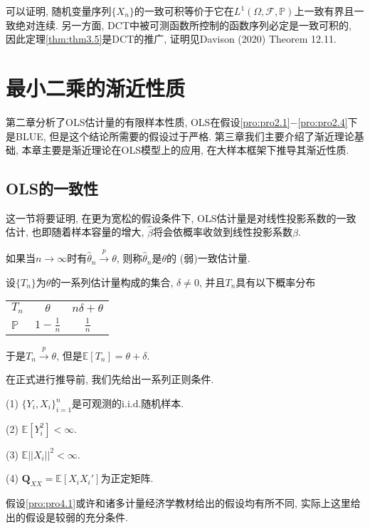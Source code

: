 \documentclass[cn, 12pt, math=mtpro2, bibstyle=apa, blue, twocol]{elegantbook}
\newcommand{\F}{\mathscr{F}}
\newcommand{\E}{\mathbb{E}}
\newcommand{\PP}{\mathbb{P}}
\newcommand{\Q}{\mathbold{Q}}
\newcommand{\hb}{\hat{\beta}}
\begin{document}
可以证明, 随机变量序列$\{X_n\}$的一致可积等价于它在$L^1(\Omega,\F,\PP)$上一致有界且一致绝对连续. 另一方面, DCT中被可测函数所控制的函数序列必定是一致可积的, 因此定理\ref{thm:thm3.5}是DCT的推广, 证明见Davison (2020) Theorem 12.11.


\chapter{最小二乘的渐近性质}
第二章分析了OLS估计量的有限样本性质, OLS在假设\ref{pro:pro2.1}$-$\ref{pro:pro2.4}下是BLUE, 但是这个结论所需要的假设过于严格. 第三章我们主要介绍了渐近理论基础, 本章主要是渐近理论在OLS模型上的应用, 在大样本框架下推导其渐近性质.
\section{OLS的一致性}
这一节将要证明, 在更为宽松的假设条件下, OLS估计量是对线性投影系数的一致估计, 也即随着样本容量的增大, $\hb$将会依概率收敛到线性投影系数$\beta$.
\begin{definition}
如果当$n\to\infty$时有$\hat{\theta}_n\xrightarrow{p}\theta$, 则称$\hat{\theta}_n$是$\theta$的 (弱)一致估计量.
\end{definition}
\begin{example}[有偏但一致的估计量]
设$\{T_n\}$为$\theta$的一系列估计量构成的集合, $\delta\ne0$, 并且$T_n$具有以下概率分布
\begin{table}[!htbp]
\centering
\begin{tabular}{lcc}
$T_n$     & $\theta$   & $n\delta+\theta$                           \\
$\PP$ & $\displaystyle 1-\frac{1}{n}$ & $\displaystyle \frac{1}{n}$
\end{tabular}
\end{table}

\noindent 于是$T_n\xrightarrow{p}\theta$, 但是$\E[T_n]=\theta+\delta$.
\end{example}
在正式进行推导前, 我们先给出一系列正则条件.
\begin{proposition}\label{pro:pro4.1}
(1) $\{Y_i,X_i\}_{i=1}^n$是可观测的i.i.d.随机样本.

(2) $\E[Y_i^2]<\infty$.

(3) $\E||X_i||^2<\infty$.

(4) $\Q_{XX}=\E[X_iX_i']$为正定矩阵.
\end{proposition}
\begin{remark}
假设\ref{pro:pro4.1}或许和诸多计量经济学教材给出的假设均有所不同, 实际上这里给出的假设是较弱的充分条件.
\end{remark}
\end{document}
